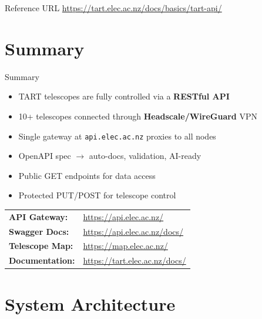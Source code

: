 \documentclass[ignorenonframetext]{beamer}
\begin{document}
\begin{frame}{Reference URL}
	\url{https://tart.elec.ac.nz/docs/basics/tart-api/}
\end{frame}

\section{Summary}

\begin{frame}{Summary}
	\begin{itemize}
		\item TART telescopes are fully controlled via a \textbf{RESTful API}
		\item 10+ telescopes connected through \textbf{Headscale/WireGuard} VPN
		\item Single gateway at \texttt{api.elec.ac.nz} proxies to all nodes
		\item OpenAPI spec $\rightarrow$ auto-docs, validation, AI-ready
		\item Public \colorbox{swagger-get!15}{\textcolor{swagger-get}{GET}} endpoints for data access
		\item Protected \colorbox{swagger-put!15}{\textcolor{swagger-put}{PUT}}/\colorbox{swagger-post!15}{\textcolor{swagger-post}{POST}} for telescope control
	\end{itemize}

	\vspace{0.4cm}
	\centering
	\begin{tabular}{ll}
		\textbf{API Gateway:}   & \url{https://api.elec.ac.nz/}       \\
		\textbf{Swagger Docs:}  & \url{https://api.elec.ac.nz/docs/}  \\
		\textbf{Telescope Map:} & \url{https://map.elec.ac.nz/}       \\
		\textbf{Documentation:} & \url{https://tart.elec.ac.nz/docs/} \\
	\end{tabular}
\end{frame}

\section{System Architecture}
\end{document}
